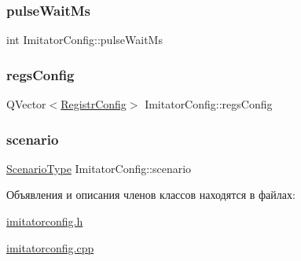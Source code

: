 \subsubsection{\texorpdfstring{pulse\+Wait\+Ms}{pulseWaitMs}}
{\footnotesize\ttfamily int Imitator\+Config\+::pulse\+Wait\+Ms}

\mbox{\label{class_imitator_config_a13decc56a73e9256fedc088cd3e2ff81}} 
\subsubsection{\texorpdfstring{regs\+Config}{regsConfig}}
{\footnotesize\ttfamily Q\+Vector$<$\hyperlink{class_registr_config}{Registr\+Config}$>$ Imitator\+Config\+::regs\+Config}

\mbox{\label{class_imitator_config_ab57ad3c191f203408cf5b1d30bf1481d}} 
\subsubsection{\texorpdfstring{scenario}{scenario}}
{\footnotesize\ttfamily \hyperlink{_random_types_8h_ae8f073eec97d33cf9783ecbe50531dfd}{Scenario\+Type} Imitator\+Config\+::scenario}



Объявления и описания членов классов находятся в файлах\+:\begin{DoxyCompactItemize}
\item 
\hyperlink{imitatorconfig_8h}{imitatorconfig.\+h}\item 
\hyperlink{imitatorconfig_8cpp}{imitatorconfig.\+cpp}\end{DoxyCompactItemize}
